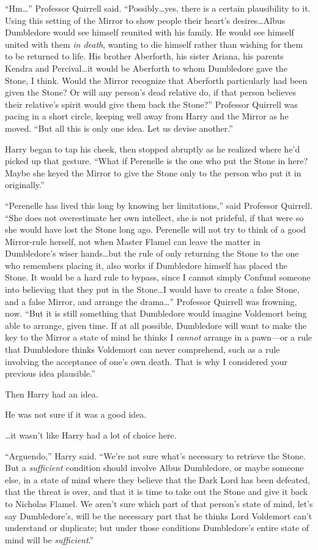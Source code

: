 “Hm…” Professor Quirrell said. “Possibly…yes, there is a certain plausibility to it. Using this setting of the Mirror to show people their heart’s desires…Albus Dumbledore would see himself reunited with his family. He would see himself united with them \emph{in death}, wanting to die himself rather than wishing for them to be returned to life. His brother Aberforth, his sister Ariana, his parents Kendra and Percival…it would be Aberforth to whom Dumbledore gave the Stone, I think. Would the Mirror recognize that Aberforth particularly had been given the Stone? Or will any person’s dead relative do, if that person believes their relative’s spirit would give them back the Stone?” Professor Quirrell was pacing in a short circle, keeping well away from Harry and the Mirror as he moved. “But all this is only one idea. Let us devise another.”

Harry began to tap his cheek, then stopped abruptly as he realized where he’d picked up that gesture. “What if Perenelle is the one who put the Stone in here? Maybe she keyed the Mirror to give the Stone only to the person who put it in originally.”

“Perenelle has lived this long by knowing her limitations,” said Professor Quirrell. “She does not overestimate her own intellect, she is not prideful, if that were so she would have lost the Stone long ago. Perenelle will not try to think of a good Mirror-rule herself, not when Master Flamel can leave the matter in Dumbledore’s wiser hands…but the rule of only returning the Stone to the one who remembers placing it, also works if Dumbledore himself has placed the Stone. It would be a hard rule to bypass, since I cannot simply Confund someone into believing that they put in the Stone…I would have to create a false Stone, and a false Mirror, and arrange the drama…” Professor Quirrell was frowning, now. “But it is still something that Dumbledore would imagine Voldemort being able to arrange, given time. If at all possible, Dumbledore will want to make the key to the Mirror a state of mind he thinks I \emph{cannot} arrange in a pawn—or a rule that Dumbledore thinks Voldemort can never comprehend, such as a rule involving the acceptance of one’s own death. That is why I considered your previous idea plausible.”

Then Harry had an idea.

He was not sure if it was a good idea.

…it wasn’t like Harry had a lot of choice here.

“Arguendo,” Harry said. “We’re not sure what’s necessary to retrieve the Stone. But a \emph{sufficient} condition should involve Albus Dumbledore, or maybe someone else, in a state of mind where they believe that the Dark Lord has been defeated, that the threat is over, and that it is time to take out the Stone and give it back to Nicholas Flamel. We aren’t sure which part of that person’s state of mind, let’s say Dumbledore’s, will be the necessary part that he thinks Lord Voldemort can’t understand or duplicate; but under those conditions Dumbledore’s entire state of mind will be \emph{sufficient}.”

